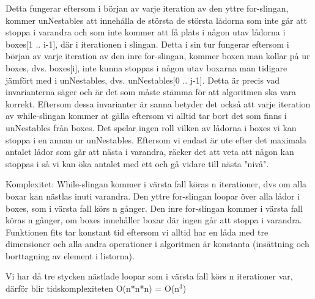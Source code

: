 \documentclass[a4paper]{article}
\begin{document}
\newpage
Detta fungerar eftersom i början av varje iteration av den yttre for-slingan, kommer unNestables att innehålla de största de största lådorna som inte går att stoppa i varandra och som inte kommer att få plats i någon utav lådorna i boxes[1 .. i-1], där i iterationen i slingan. Detta i sin tur fungerar eftersom i början av varje iteration av den inre for-slingan, kommer boxen man kollar på ur boxes, dvs. boxes[i], inte kunna stoppas i någon utav boxarna man tidigare jämfört med i unNestables, dvs. unNestables[0 .. j-1]. Detta är precis vad invarianterna säger och är det som måste stämma för att algoritmen ska vara korrekt. Eftersom dessa invarianter är sanna betyder det också att varje iteration av while-slingan kommer at gälla eftersom vi alltid tar bort det som finns i unNestables från boxes. Det spelar ingen roll vilken av lådorna i boxes vi kan stoppa i en annan ur unNestables. Eftersom vi endast är ute efter det maximala antalet lådor som går att nästa i varandra, räcker det att veta att någon kan stoppas i så vi kan öka antalet med ett och gå vidare till nästa "nivå".\newline


Komplexitet: While-slingan kommer i värsta fall köras n iterationer, dvs om alla boxar kan nästlas inuti varandra.
Den yttre for-slingan loopar över alla lådor i boxes, som i värsta fall körs n gånger.
Den inre for-slingan kommer i värsta fall köras n gånger, om boxes innehåller boxar där ingen går att stoppa i varandra.
Funktionen fits tar konstant tid eftersom vi alltid har en låda med tre dimensioner och alla andra operationer i algoritmen är konstanta (insättning och borttagning av element i listorna).

Vi har då tre stycken nästlade loopar som i värsta fall körs n iterationer var, därför blir tidskomplexiteten O(n*n*n) = O(n$^3$)
\end{document}
